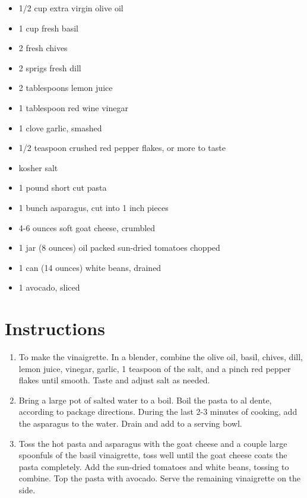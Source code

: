 \documentclass[
  letterpaper,
  DIV=11,
  numbers=noendperiod,
  titlepage=false]{scrreprt}
\providecommand{\tightlist}{%
  \setlength{\itemsep}{0pt}\setlength{\parskip}{0pt}}\usepackage{longtable,booktabs,array}
\begin{document}
\begin{itemize}
\tightlist
\item
  1/2 cup extra virgin olive oil
\item
  1 cup fresh basil
\item
  2 fresh chives
\item
  2 sprigs fresh dill
\item
  2 tablespoons lemon juice
\item
  1 tablespoon red wine vinegar
\item
  1 clove garlic, smashed
\item
  1/2 teaspoon crushed red pepper flakes, or more to taste
\item
  kosher salt
\item
  1 pound short cut pasta
\item
  1 bunch asparagus, cut into 1 inch pieces
\item
  4-6 ounces soft goat cheese, crumbled
\item
  1 jar (8 ounces) oil packed sun-dried tomatoes chopped
\item
  1 can (14 ounces) white beans, drained
\item
  1 avocado, sliced
\end{itemize}

\section{Instructions}\label{instructions-12}

\begin{enumerate}
\def\labelenumi{\arabic{enumi}.}
\tightlist
\item
  To make the vinaigrette. In a blender, combine the olive oil, basil,
  chives, dill, lemon juice, vinegar, garlic, 1 teaspoon of the salt,
  and a pinch red pepper flakes until smooth. Taste and adjust salt as
  needed.
\item
  Bring a large pot of salted water to a boil. Boil the pasta to al
  dente, according to package directions. During the last 2-3 minutes of
  cooking, add the asparagus to the water. Drain and add to a serving
  bowl.
\item
  Toss the hot pasta and asparagus with the goat cheese and a couple
  large spoonfuls of the basil vinaigrette, toss well until the goat
  cheese coats the pasta completely. Add the sun-dried tomatoes and
  white beans, tossing to combine. Top the pasta with avocado. Serve the
  remaining vinaigrette on the side.
\end{enumerate}
\end{document}
